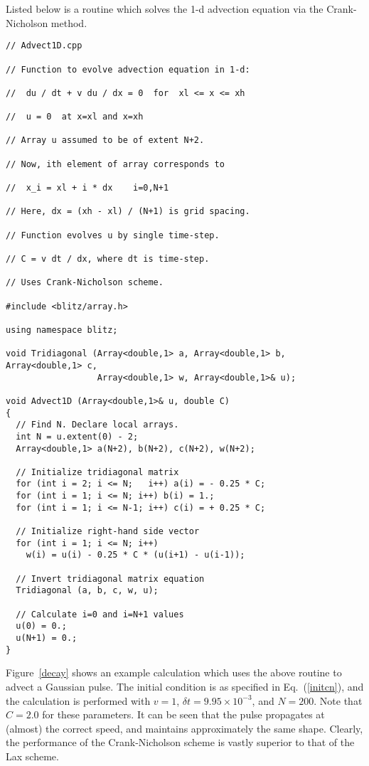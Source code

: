 Listed below is a routine which solves the 1-d advection equation
via the Crank-Nicholson method.
{\small\begin{verbatim}
// Advect1D.cpp

// Function to evolve advection equation in 1-d:

//  du / dt + v du / dx = 0  for  xl <= x <= xh

//  u = 0  at x=xl and x=xh

// Array u assumed to be of extent N+2.

// Now, ith element of array corresponds to

//  x_i = xl + i * dx    i=0,N+1

// Here, dx = (xh - xl) / (N+1) is grid spacing.

// Function evolves u by single time-step.

// C = v dt / dx, where dt is time-step.

// Uses Crank-Nicholson scheme.

#include <blitz/array.h>

using namespace blitz;

void Tridiagonal (Array<double,1> a, Array<double,1> b, Array<double,1> c, 
                  Array<double,1> w, Array<double,1>& u);

void Advect1D (Array<double,1>& u, double C)
{  
  // Find N. Declare local arrays.
  int N = u.extent(0) - 2;
  Array<double,1> a(N+2), b(N+2), c(N+2), w(N+2);

  // Initialize tridiagonal matrix
  for (int i = 2; i <= N;   i++) a(i) = - 0.25 * C;
  for (int i = 1; i <= N; i++) b(i) = 1.;
  for (int i = 1; i <= N-1; i++) c(i) = + 0.25 * C;

  // Initialize right-hand side vector
  for (int i = 1; i <= N; i++)
    w(i) = u(i) - 0.25 * C * (u(i+1) - u(i-1));

  // Invert tridiagonal matrix equation
  Tridiagonal (a, b, c, w, u);

  // Calculate i=0 and i=N+1 values
  u(0) = 0.;
  u(N+1) = 0.;
}
\end{verbatim}}

Figure~\ref{decay} shows an example calculation which uses the above routine to
advect a Gaussian pulse. The initial condition is as specified in Eq.~(\ref{initcn}),
and the calculation is performed with $v=1$, $\delta t = 9.95\times 10^{-3}$, and $N=200$.
Note that $C=2.0$ for these parameters. It can be seen that the pulse propagates at (almost) the
correct speed, and maintains approximately the same shape. Clearly, the
performance of the Crank-Nicholson scheme is vastly superior to that of the Lax scheme.

